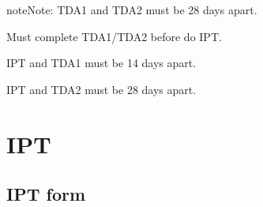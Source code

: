 \documentclass[letterpaper,10pt,english,openany,oneside]{sphinxmanual}
\begin{document}
\begin{sphinxadmonition}{note}{Note:}
\sphinxAtStartPar
TDA1 and TDA2 must be 28 days apart.

\sphinxAtStartPar
Must complete TDA1/TDA2 before do IPT.

\sphinxAtStartPar
IPT and TDA1 must be 14 days apart.

\sphinxAtStartPar
IPT and TDA2 must be 28 days apart.
\end{sphinxadmonition}


\section{IPT}
\label{\detokenize{api-last-mile/v1:ipt}}

\subsection{IPT form}
\label{\detokenize{api-last-mile/v1:ipt-form}}
\end{document}
